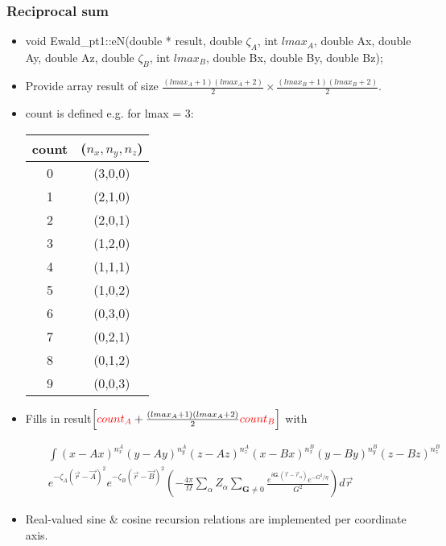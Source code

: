 \documentclass[8pt]{beamer}
\begin{document}
\begin{frame}

   \frametitle{Reciprocal sum}
   \begin{itemize}
   \item void Ewald\_pt1::eN(double * {\color{blue}result}, double $\zeta_A$, int $lmax_A$, double Ax, double Ay, double Az, double $\zeta_B$, int $lmax_B$, double Bx, double By, double Bz);\\
   
   \item Provide array {\color{blue}result} of size $\frac{(lmax_A+1)(lmax_A+2)}{2} \times \frac{(lmax_B+1)(lmax_B+2)}{2}$.
   
   \item {\color{red}count} is defined e.g. for lmax = 3:
   {\tiny \begin{table}
   \begin{tabular}{|c|c|}
   \hline
   count & ($n_x,n_y,n_z$)\\
   \hline
   0 & (3,0,0)\\
   1 & (2,1,0)\\
   2 & (2,0,1)\\
   3 & (1,2,0)\\
   4 & (1,1,1)\\
   5 & (1,0,2)\\
   6 & (0,3,0)\\
   7 & (0,2,1)\\
   8 & (0,1,2)\\
   9 & (0,0,3)\\
   \hline
   \end{tabular}
   \end{table}}
   
   \item Fills in {\color{blue}result}$\left[{\color{red}count_A} + \frac{(lmax_A+1)(lmax_A+2)}{2} {\color{red}count_B}\right]$ with

   \begin{eqnarray}
   & & \int (x-Ax)^{n^A_x} (y-Ay)^{n^A_y} (z-Az)^{n^A_z} (x-Bx)^{n^B_x} (y-By)^{n^B_y} (z-Bz)^{n^B_z} \\
   & & e^{-\zeta_A (\vec{r} - \vec{A})^2} e^{-\zeta_B (\vec{r} - \vec{B})^2} \left( - \frac{4 \pi}{\Omega} \sum\limits_{\alpha} Z_{\alpha} \sum\limits_{\mathbf{G} \neq 0} \frac{e^{i \mathbf{G}.(\vec{r} - \vec{r}_{\alpha})} e^{-G^2/\eta}}{G^2} \right) d \vec{r}
   \end{eqnarray}
   
   \item Real-valued sine \& cosine recursion relations are implemented per coordinate axis.

   \end{itemize}
   
\end{frame}
\end{document}

